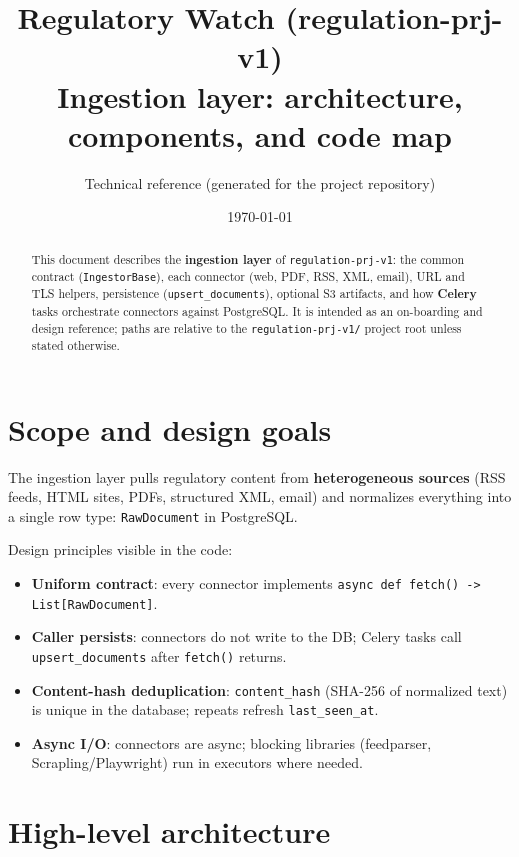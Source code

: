 \documentclass[11pt,a4paper]{article}
\title{\textbf{Regulatory Watch (regulation-prj-v1)}\\[0.5em]
\Large Ingestion layer: architecture, components, and code map}
\author{Technical reference (generated for the project repository)}
\date{\today}
\begin{document}
\maketitle

\begin{abstract}
This document describes the \textbf{ingestion layer} of \texttt{regulation-prj-v1}:
the common contract (\texttt{IngestorBase}), each connector (web, PDF, RSS, XML, email),
URL and TLS helpers, persistence (\texttt{upsert\_documents}), optional S3 artifacts,
and how \textbf{Celery} tasks orchestrate connectors against PostgreSQL.
It is intended as an on-boarding and design reference; paths are relative to the
\texttt{regulation-prj-v1/} project root unless stated otherwise.
\end{abstract}

\tableofcontents
\newpage

\section{Scope and design goals}

The ingestion layer pulls regulatory content from \textbf{heterogeneous sources}
(RSS feeds, HTML sites, PDFs, structured XML, email) and normalizes everything into
a single row type: \texttt{RawDocument} in PostgreSQL.

Design principles visible in the code:
\begin{itemize}
  \item \textbf{Uniform contract}: every connector implements
  \texttt{async def fetch() -> List[RawDocument]}.
  \item \textbf{Caller persists}: connectors do not write to the DB; Celery tasks
  call \texttt{upsert\_documents} after \texttt{fetch()} returns.
  \item \textbf{Content-hash deduplication}: \texttt{content\_hash} (SHA-256 of
  normalized text) is unique in the database; repeats refresh \texttt{last\_seen\_at}.
  \item \textbf{Async I/O}: connectors are async; blocking libraries (feedparser,
  Scrapling/Playwright) run in executors where needed.
\end{itemize}

\section{High-level architecture}
\end{document}
